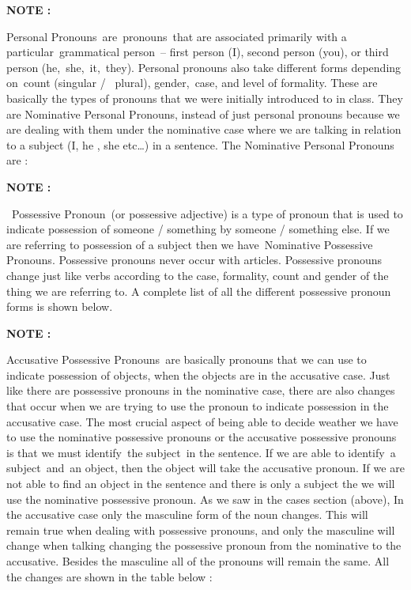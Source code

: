 \documentclass[a4paper,12pt]{article}
\begin{document}
\vspace{0.25cm}
\color{flame} \textbf {NOTE :} \color{black} 

Personal Pronouns are pronouns that are associated primarily with a
particular grammatical person – first person (I), second person (you), or third
person (he, she, it, they). Personal pronouns also take different forms
depending on count (singular /  plural), gender, case, and level of formality.
These are basically the types of pronouns that we were initially introduced to
in class. They are Nominative Personal Pronouns, instead of just personal
pronouns because we are dealing with them under the nominative case where we are
talking in relation to a subject (I, he , she etc…) in a sentence.
The Nominative Personal Pronouns are :


\vspace{0.25cm}
\color{flame} \textbf {NOTE :} \color{black} 


 Possessive Pronoun (or possessive adjective) is a type of pronoun that is used
to indicate possession of someone / something by someone / something else. If we
are referring to possession of a subject then we have Nominative Possessive
Pronouns. Possessive pronouns never occur with articles. Possessive pronouns
change just like verbs according to the case, formality, count and gender of the
thing we are referring to. A complete list of all the different possessive
pronoun forms is shown below.


\vspace{0.25cm}
\color{flame} \textbf {NOTE :} \color{black} 


Accusative Possessive Pronouns are basically pronouns that we can use to
indicate possession of objects, when the objects are in the accusative case.
Just like there are possessive pronouns in the nominative case, there are also
changes that occur when we are trying to use the pronoun to indicate possession
in the accusative case. The most crucial aspect of being able to decide weather
we have to use the nominative possessive pronouns or the accusative possessive
pronouns is that we must identify the subject in the sentence. If we are able to
identify a subject and an object, then the object will take the accusative
pronoun. If we are not able to find an object in the sentence and there is only
a subject the we will use the nominative possessive pronoun. As we saw in the
cases section (above), In the accusative case only the masculine form of the
noun changes. This will remain true when dealing with possessive pronouns, and
only the masculine will change when talking changing the possessive pronoun from
the nominative to the accusative. Besides the masculine all of the pronouns will
remain the same. All the changes are shown in the table below :
\end{document}
